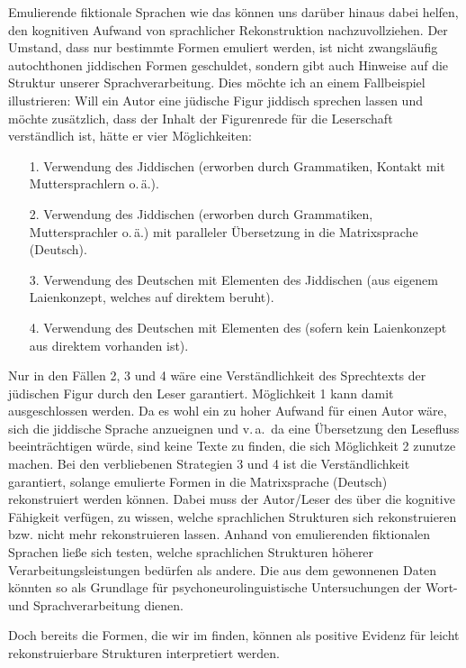 Emulierende fiktionale Sprachen wie das \hai{{\LiJi}} können uns darüber hinaus dabei helfen, den kognitiven Aufwand von sprachlicher Rekonstruktion nachzuvollziehen. 
Der Umstand, dass nur bestimmte Formen emuliert werden, ist nicht zwangsläufig autochthonen jiddischen Formen geschuldet, sondern gibt auch Hinweise auf die Struktur unserer Sprachverarbeitung. Dies möchte ich an einem Fallbeispiel illustrieren: Will ein Autor eine jüdische Figur jiddisch sprechen lassen und möchte zusätzlich, dass der Inhalt der Figurenrede für die Leserschaft verständlich ist, hätte er vier Möglichkeiten: 

\begin{itemize}
\item [1.] Verwendung des Jiddischen (erworben durch Grammatiken, Kontakt mit Muttersprachlern o.\,ä.).
\item [2.] Verwendung des Jiddischen (erworben durch Grammatiken, Muttersprachler o.\,ä.) mit paralleler Übersetzung in die Matrixsprache (Deutsch).
\item [3.] Verwendung des Deutschen mit Elementen des Jiddischen (aus eigenem Laienkonzept, welches auf direktem  beruht).
\item [4.] Verwendung des Deutschen mit Elementen des \hai{{\LiJi}} (sofern kein Laienkonzept aus direktem  vorhanden ist).
\end{itemize}

Nur in den Fällen 2, 3 und 4 wäre eine Verständlichkeit des Sprechtexts der jüdischen Figur durch den Leser garantiert. Möglichkeit 1 kann damit ausgeschlossen werden. Da es wohl ein zu hoher Aufwand für einen Autor wäre, sich die jiddische Sprache anzueignen und v.\,a.\, da eine Übersetzung den Lesefluss beeinträchtigen würde, sind keine Texte zu finden, die sich Möglichkeit 2 zunutze machen. Bei den verbliebenen Strategien 3 und 4 ist die Verständlichkeit garantiert, solange emulierte Formen in die Matrixsprache (Deutsch)  rekonstruiert werden können. Dabei muss der Autor/Leser des \hai{{\LiJi}} über die kognitive Fähigkeit verfügen, zu wissen, welche sprachlichen Strukturen sich rekonstruieren bzw. nicht mehr rekonstruieren lassen. Anhand von emulierenden fiktionalen Sprachen ließe sich testen, welche sprachlichen Strukturen höherer Verarbeitungsleistungen bedürfen als andere. Die aus dem \hai{{\LiJi}} gewonnenen Daten könnten so als Grundlage für psychoneurolinguistische Untersuchungen der Wort- und Sprachverarbeitung dienen.

Doch bereits die Formen, die wir im \hai{{\LiJi}} finden, können als positive Evidenz für leicht rekonstruierbare Strukturen interpretiert werden.


